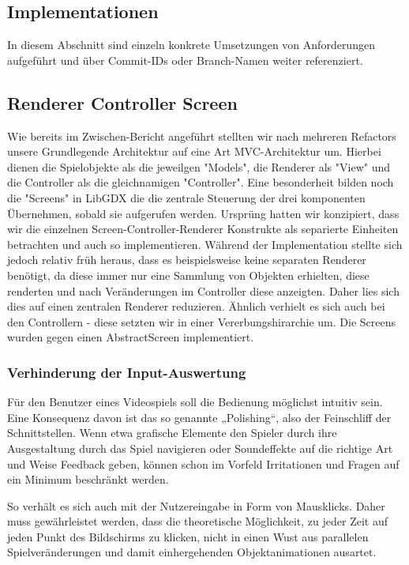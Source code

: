 \subsection{Implementationen}
In diesem Abschnitt sind einzeln konkrete Umsetzungen von Anforderungen aufgeführt und über Commit-IDs oder Branch-Namen weiter referenziert.

\subsection{Renderer Controller Screen}
Wie bereits im Zwischen-Bericht angeführt stellten wir nach mehreren Refactors unsere Grundlegende Architektur auf eine Art MVC-Architektur um. 
Hierbei dienen die Spielobjekte als die jeweilgen "Models", die Renderer als "View" und die Controller als die gleichnamigen "Controller". Eine besonderheit bilden noch die "Screens" in LibGDX die die zentrale Steuerung der drei komponenten Übernehmen, sobald sie aufgerufen werden.
Ursprüng hatten wir konzipiert, dass wir die einzelnen Screen-Controller-Renderer Konstrukte als separierte Einheiten betrachten und auch so implementieren. Während der Implementation stellte sich jedoch relativ früh heraus, dass es beispielsweise keine separaten Renderer benötigt, da diese immer nur eine Sammlung von Objekten erhielten, diese renderten und nach Veränderungen im Controller diese anzeigten. Daher lies sich dies auf einen zentralen Renderer reduzieren. Ähnlich verhielt es sich auch bei den Controllern - diese setzten wir in einer Vererbungshirarchie um. Die Screens wurden gegen einen AbstractScreen implementiert.

\subsubsection{Verhinderung der Input-Auswertung}
Für den Benutzer eines Videospiels soll die Bedienung möglichst intuitiv sein. Eine Konsequenz davon ist das so genannte „Polishing“, also der Feinschliff der Schnittstellen. Wenn etwa grafische Elemente den Spieler durch ihre Ausgestaltung durch das Spiel navigieren oder Soundeffekte auf die richtige Art und Weise Feedback geben, können schon im Vorfeld Irritationen und Fragen auf ein Minimum beschränkt werden.

So verhält es sich auch mit der Nutzereingabe in Form von Mausklicks. Daher muss gewährleistet werden, dass die theoretische Möglichkeit, zu jeder Zeit auf jeden Punkt des Bildschirms zu klicken, nicht in einen Wust aus parallelen Spielveränderungen und damit einhergehenden Objektanimationen ausartet.

